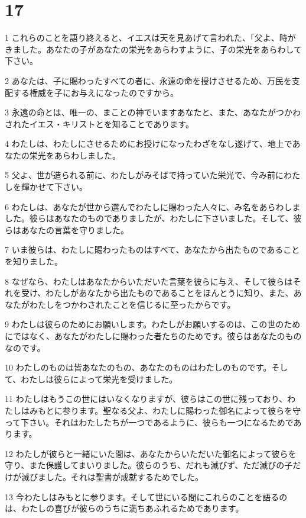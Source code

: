 \chapter{17}

\par 1 これらのことを語り終えると、イエスは天を見あげて言われた、「父よ、時がきました。あなたの子があなたの栄光をあらわすように、子の栄光をあらわして下さい。
\par 2 あなたは、子に賜わったすべての者に、永遠の命を授けさせるため、万民を支配する権威を子にお与えになったのですから。
\par 3 永遠の命とは、唯一の、まことの神でいますあなたと、また、あなたがつかわされたイエス・キリストとを知ることであります。
\par 4 わたしは、わたしにさせるためにお授けになったわざをなし遂げて、地上であなたの栄光をあらわしました。
\par 5 父よ、世が造られる前に、わたしがみそばで持っていた栄光で、今み前にわたしを輝かせて下さい。
\par 6 わたしは、あなたが世から選んでわたしに賜わった人々に、み名をあらわしました。彼らはあなたのものでありましたが、わたしに下さいました。そして、彼らはあなたの言葉を守りました。
\par 7 いま彼らは、わたしに賜わったものはすべて、あなたから出たものであることを知りました。
\par 8 なぜなら、わたしはあなたからいただいた言葉を彼らに与え、そして彼らはそれを受け、わたしがあなたから出たものであることをほんとうに知り、また、あなたがわたしをつかわされたことを信じるに至ったからです。
\par 9 わたしは彼らのためにお願いします。わたしがお願いするのは、この世のためにではなく、あなたがわたしに賜わった者たちのためです。彼らはあなたのものなのです。
\par 10 わたしのものは皆あなたのもの、あなたのものはわたしのものです。そして、わたしは彼らによって栄光を受けました。
\par 11 わたしはもうこの世にはいなくなりますが、彼らはこの世に残っており、わたしはみもとに参ります。聖なる父よ、わたしに賜わった御名によって彼らを守って下さい。それはわたしたちが一つであるように、彼らも一つになるためであります。
\par 12 わたしが彼らと一緒にいた間は、あなたからいただいた御名によって彼らを守り、また保護してまいりました。彼らのうち、だれも滅びず、ただ滅びの子だけが滅びました。それは聖書が成就するためでした。
\par 13 今わたしはみもとに参ります。そして世にいる間にこれらのことを語るのは、わたしの喜びが彼らのうちに満ちあふれるためであります。
